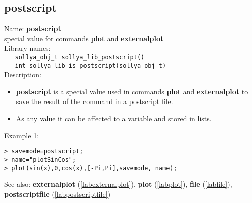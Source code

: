 \subsection{postscript}
\label{labpostscript}
\noindent Name: \textbf{postscript}\\
\phantom{aaa}special value for commands \textbf{plot} and \textbf{externalplot}\\[0.2cm]
\noindent Library names:\\
\verb|   sollya_obj_t sollya_lib_postscript()|\\
\verb|   int sollya_lib_is_postscript(sollya_obj_t)|\\[0.2cm]
\noindent Description: \begin{itemize}

\item \textbf{postscript} is a special value used in commands \textbf{plot} and \textbf{externalplot} to save
   the result of the command in a postscript file.

\item As any value it can be affected to a variable and stored in lists.
\end{itemize}
\noindent Example 1: 
\begin{center}\begin{minipage}{15cm}\begin{Verbatim}[frame=single]
> savemode=postscript;
> name="plotSinCos";
> plot(sin(x),0,cos(x),[-Pi,Pi],savemode, name);
\end{Verbatim}
\end{minipage}\end{center}
See also: \textbf{externalplot} (\ref{labexternalplot}), \textbf{plot} (\ref{labplot}), \textbf{file} (\ref{labfile}), \textbf{postscriptfile} (\ref{labpostscriptfile})
